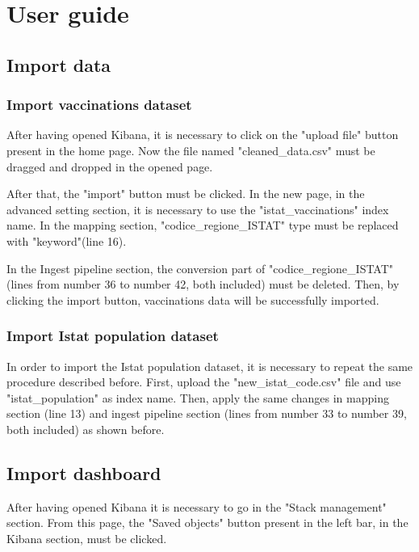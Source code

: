 \documentclass{article}
\begin{document}
\newpage

\section{User guide}

\subsection{Import data}
\subsubsection{Import vaccinations dataset}
After having opened Kibana, it is necessary to click on the {\selectfont"upload file"} button present in the home page. Now the file named {\selectfont"cleaned\_data.csv"} must be dragged and dropped in the opened page.

After that, the {\selectfont"import"} button must be clicked. In the new page, in the advanced setting section, it is necessary to use the {\selectfont"istat\_vaccinations"} index name. In the mapping section, {\selectfont"codice\_regione\_ISTAT"} type must be replaced with "keyword"(line 16).

In the Ingest pipeline section, the conversion part of {\selectfont"codice\_regione\_ISTAT"} (lines from number 36 to number 42, both included) must be deleted.
Then, by clicking the import button, vaccinations data will be successfully imported.

\subsubsection{Import Istat population dataset}
In order to import the Istat population dataset, it is necessary to repeat the same procedure described before. First, upload the {\selectfont"new\_istat\_code.csv"} file and use {\selectfont"istat\_population"} as index name. Then, apply the same changes in mapping section (line 13) and ingest pipeline section (lines from number 33 to number 39, both included) as shown before.


\subsection{Import dashboard}
After having opened Kibana it is necessary to go in the {\selectfont"Stack management"} section. From this page, the {\selectfont"Saved objects"} button present in the left bar, in the Kibana section, must be clicked. 
\end{document}
